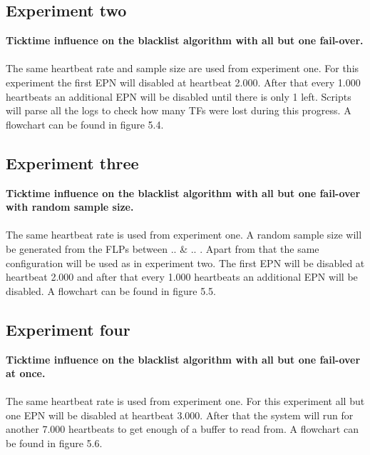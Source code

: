 
\subsection{Experiment two}
\textbf{Ticktime influence on the blacklist algorithm with all but one fail-over.}
\\\\
The same heartbeat rate and sample size are used from experiment one. For this experiment the first EPN will disabled at heartbeat 2.000. After that every 1.000 heartbeats an additional EPN will be disabled until there is only 1 left. Scripts will parse all the logs to check how many TFs were lost during this progress. A flowchart can be found in figure 5.4.


\subsection{Experiment three}
\textbf{Ticktime influence on the blacklist algorithm with all but one fail-over with random sample size.}
\\\\
The same heartbeat rate is used from experiment one. A random sample size will be generated from the FLPs between .. \& .. . Apart from that the same configuration will be used as in experiment two. The first EPN will be disabled at heartbeat 2.000 and after that every 1.000 heartbeats an additional EPN will be disabled. A flowchart can be found in figure 5.5.


\subsection{Experiment four}
\textbf{Ticktime influence on the blacklist algorithm with all but one fail-over at once.}
\\\\
The same heartbeat rate is used from experiment one. For this experiment all but one EPN will be disabled at heartbeat 3.000. After that the system will run for another 7.000 heartbeats to get enough of a buffer to read from. A flowchart can be found in figure 5.6.